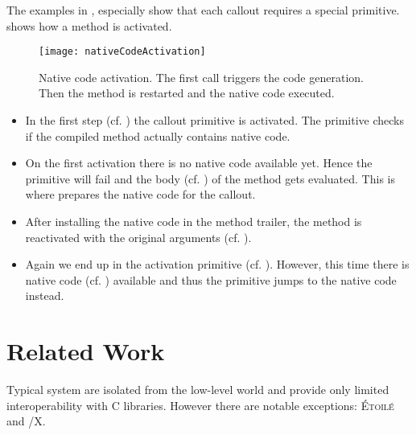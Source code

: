 The examples in , especially  show that each \NBFFI callout requires a special primitive.
 shows how a \NB method is activated.


\begin{figure}[h]
	\centering
	\texttt{[image: nativeCodeActivation]}
	\caption[\NB Native Code Activation]{Native code activation. The first call triggers the code generation. Then the method is restarted and the native code executed.}
\end{figure}

\begin{itemize}
\item In the first step (cf. ) the \NB callout primitive is activated.
	The primitive checks if the compiled method actually contains native code.
\item On the first activation there is no native code available yet.
	Hence the primitive will fail and the \ST body (cf. ) of the \NB method gets evaluated.
	This is where \NB prepares the native code for the \FFI callout.
\item After installing the native code in the method trailer, the \NB method is reactivated with the original arguments (cf. ).
\item Again we end up in the \NB activation primitive (cf. ).
	However, this time there is native code (cf. ) available and thus the primitive jumps to the native code instead.
\end{itemize}

\section{Related Work}


Typical \ST system are isolated from the low-level world and provide only limited interoperability with C libraries.
However there are notable exceptions: \textsc{Étoilé} and \ST/X.


